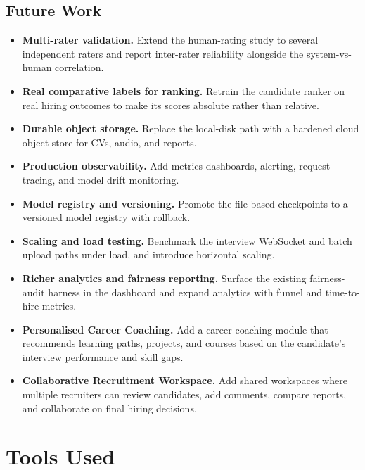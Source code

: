 \documentclass[12pt,a4paper,oneside]{report}
\begin{document}
\section{Future Work}

\begin{itemize}
  \item \textbf{Multi-rater validation.} Extend the human-rating study to several independent
    raters and report inter-rater reliability alongside the system-vs-human correlation.
  \item \textbf{Real comparative labels for ranking.} Retrain the candidate ranker on real
    hiring outcomes to make its scores absolute rather than relative.
  \item \textbf{Durable object storage.} Replace the local-disk path with a hardened cloud
    object store for CVs, audio, and reports.
  \item \textbf{Production observability.} Add metrics dashboards, alerting, request tracing,
    and model drift monitoring.
  \item \textbf{Model registry and versioning.} Promote the file-based checkpoints to a
    versioned model registry with rollback.
  \item \textbf{Scaling and load testing.} Benchmark the interview WebSocket and batch upload
    paths under load, and introduce horizontal scaling.
  \item \textbf{Richer analytics and fairness reporting.} Surface the existing fairness-audit
    harness in the dashboard and expand analytics with funnel and time-to-hire metrics.
  \item \textbf{Personalised Career Coaching.} Add a career coaching module that recommends
    learning paths, projects, and courses based on the candidate's interview performance and
    skill gaps.
  \item \textbf{Collaborative Recruitment Workspace.} Add shared workspaces where multiple
    recruiters can review candidates, add comments, compare reports, and collaborate on final
    hiring decisions.
\end{itemize}


\chapter*{Tools Used}
\end{document}
